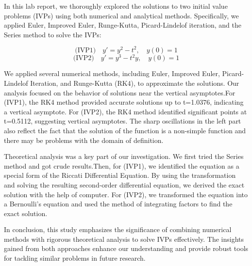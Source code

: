 \documentclass{article}
\begin{document}
In this lab report, we thoroughly explored the solutions to two initial value problems (IVPs) using both numerical and analytical methods. Specifically, we applied Euler, Improved Euler, Runge-Kutta, Picard-Lindelof iteration, and the Series method to solve the IVPs:

\begin{equation*}
    \text{(IVP1)} \quad y' = y^2 - t^2, \quad y(0) = 1
\end{equation*}
\begin{equation*}
    \text{(IVP2)} \quad y' = y^3 - t^2y, \quad y(0) = 1
\end{equation*}

We applied several numerical methods, including Euler, Improved Euler, Picard-Lindelof Iteration, and Runge-Kutta (RK4), to approximate the solutions. Our analysis focused on the behavior of solutions near the vertical asymptotes.For (IVP1), the RK4 method provided accurate solutions up to t=1.0376, indicating a vertical asymptote. For (IVP2), the RK4 method identified significant points at t=0.5112, suggesting vertical asymptotes. The sharp oscillations in the left part also reflect the fact that the solution of the function is a non-simple function and there may be problems with the domain of definition.

Theoretical analysis was a key part of our investigation.
We first tried the Series method and got crude results.Then, for (IVP1), we identified the equation as a special form of the Riccati Differential Equation. By using the transformation and solving the resulting second-order differential equation, we derived the exact solution with the help of computer.
For (IVP2), we transformed the equation into a Bernoulli's equation and used the method of integrating factors to find the exact solution.

In conclusion, this study emphasizes the significance of combining numerical methods with rigorous theoretical analysis to solve IVPs effectively. The insights gained from both approaches enhance our understanding and provide robust tools for tackling similar problems in future research.
\end{document}
